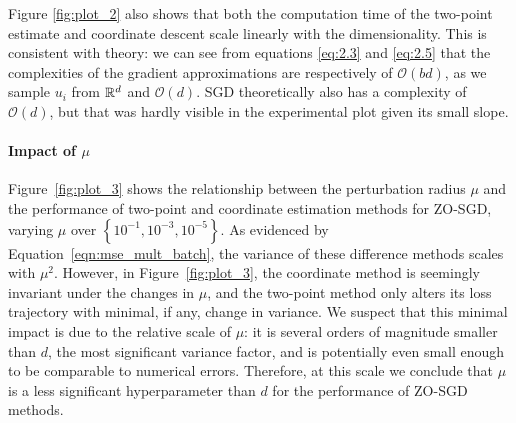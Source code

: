 Figure \ref{fig:plot_2} also shows that both the computation time of the two-point estimate and coordinate descent scale linearly with the dimensionality. This is consistent with theory: we can see from equations \eqref{eq:2.3} and \eqref{eq:2.5} that the complexities of the gradient approximations are respectively of $\mathcal{O}\left(b d\right)$, as we sample $u_i$ from $\mathbb{R}^d$ and $\mathcal{O}\left(d\right)$. SGD theoretically also has a complexity of $\mathcal{O}\left(d\right)$, but that was hardly visible in the experimental plot given its small slope.

\paragraph{Impact of $\mu$}
Figure~\ref{fig:plot_3} shows the relationship between the perturbation radius $\mu$ and the performance of two-point and coordinate estimation methods for ZO-SGD, varying $\mu$ over $\left\{10^{-1}, 10^{-3}, 10^{-5}\right\}$. As evidenced by Equation~\eqref{eqn:mse_mult_batch}, the variance of these difference methods scales with $\mu^2$. However, in Figure~\ref{fig:plot_3}, the coordinate method is seemingly invariant under the changes in $\mu$, and the two-point method only alters its loss trajectory with minimal, if any, change in variance. We suspect that this minimal impact is due to the relative scale of $\mu$: it is several orders of magnitude smaller than $d$, the most significant variance factor, and is potentially even small enough to be comparable to numerical errors. Therefore, at this scale we conclude that $\mu$ is a less significant hyperparameter than $d$ for the performance of ZO-SGD methods.